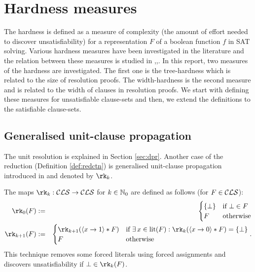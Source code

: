 \documentclass{report}
\begin{document}
\chapter{Hardness measures}
\label{cha:Hardness Measures}

The hardness is defined as a measure of complexity (the amount of effort needed to discover unsatisfiability) for a representation $F$ of a boolean function $f$ in SAT solving. Various hardness measures have been investigated in the literature and the relation between these measures is studied in \cite{h5},\cite{h18},\cite{h8}. In this report, two measures of the hardness are investigated. The first one is the tree-hardness which is related to the size of resolution proofs. The width-hardness is the second measure and is related to the width of clauses in resolution proofs. We start with defining these measures for unsatisfiable clause-sets and then, we extend the definitions to the satisfiable clause-sets. 

\section{Generalised unit-clause propagation}
\label{sec:rkred}

The unit resolution is explained in Section \ref{sec:dpr}. Another case of the reduction (Definition \ref{def:redctn}) is generalised unit-clause propagation introduced in \cite{h10} and denoted by $\rk_k$. 

\begin{defi}\label{def:rk}
\cite{h10} The maps $\rk_k: \Cls \ra \Cls$ for $k \in \mathbb{N}_0$ are defined as follows (for $F \in \mathcal{CLS}$):
  \begin{eqnarray*}
  \rk_0(F) & := &
  \begin{cases}
  \set{\bot} & \text{if } \bot \in F\\ F & \text{otherwise}
  \end{cases}\\
  \rk_{k+1}(F) & := &
  \begin{cases}
  \rk_{k+1}(\pao x1 * F) & \text{if } \ex\, x \in \lit(F) : \rk_k(\pao x0 * F) = \set{\bot}\\ F & \text{otherwise}
  \end{cases}.
  \end{eqnarray*}
This technique removes some forced literals using forced assignments and discovers unsatisfiability if $\bot \in \rk_k(F)$.
\end{defi} 
\end{document}
